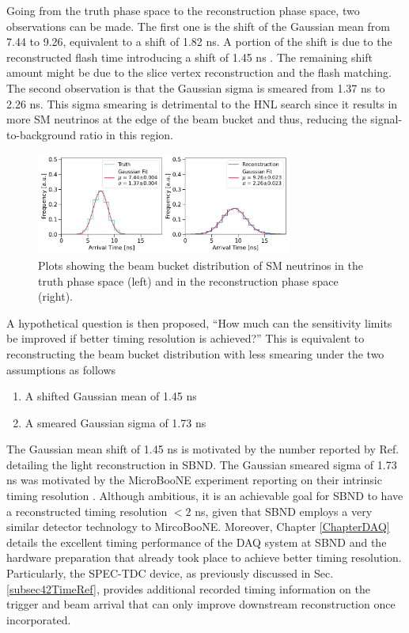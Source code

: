 Going from the truth phase space to the reconstruction phase space, two observations can be made.
The first one is the shift of the Gaussian mean from 7.44 to 9.26, equivalent to a shift of 1.82 ns.
A portion of the shift is due to the reconstructed flash time introducing a shift of 1.45 ns \cite{sbnd_pd
s_paper}.
The remaining shift amount might be due to the slice vertex reconstruction and the flash matching.      
The second observation is that the Gaussian sigma is smeared from 1.37 ns to 2.26 ns. 
This sigma smearing is detrimental to the HNL search since it results in more SM neutrinos at the edge of the beam bucket and thus, reducing the signal-to-background ratio in this region.                     

\begin{figure}[htbp!]
    \vspace{1cm}
    \centering
    \includegraphics[width=0.75\textwidth]{truth_reco_gaus.png}
    \caption{Plots showing the beam bucket distribution of SM neutrinos in the truth phase space (left) and in the reconstruction phase space (right).}
    \label{fig:gaus_truth_reco}
\end{figure}

A hypothetical question is then proposed, ``How much can the sensitivity limits be improved if better timing resolution is achieved?''
This is equivalent to reconstructing the beam bucket distribution with less smearing under the two assumptions as follows
\begin{enumerate}
    \item A shifted Gaussian mean of 1.45 ns
    \item A smeared Gaussian sigma of 1.73 ns
\end{enumerate}
The Gaussian mean shift of 1.45 ns is motivated by the number reported by Ref. \cite{sbnd_pds_paper} detailing the light reconstruction in SBND. 
The Gaussian smeared sigma of 1.73 ns was motivated by the MicroBooNE experiment reporting on their intrinsic timing resolution \cite{uboone_ns}.
Although ambitious, it is an achievable goal for SBND to have a reconstructed timing resolution $< 2$ ns, given that SBND employs a very similar detector technology to MircoBooNE.
Moreover, Chapter \ref{ChapterDAQ} details the excellent timing performance of the DAQ system at SBND and the hardware preparation that already took place to achieve better timing resolution.
Particularly, the SPEC-TDC device, as previously discussed in Sec. \ref{subsec42TimeRef}, provides additional recorded timing information on the trigger and beam arrival that can only improve downstream reconstruction once incorporated. 

